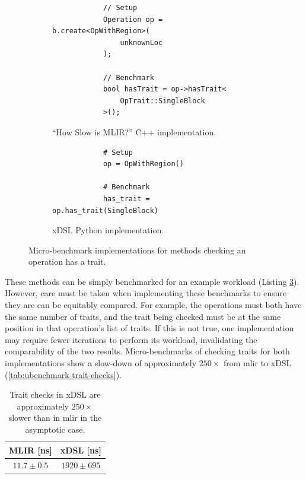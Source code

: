 \begin{figure}[H]
    \centering
    \begin{subfigure}[b]{0.45\textwidth}
       \centering
        \begin{verbatim}
            // Setup
            Operation op = b.create<OpWithRegion>(
                unknownLoc
            );

            // Benchmark
            bool hasTrait = op->hasTrait<
                OpTrait::SingleBlock
            >();
        \end{verbatim}
        \caption{``How Slow is MLIR?'' C++ implementation.}
        \label{listing:ubenchmark-trait-checks-bench-mlir}
    \end{subfigure}
    \hfill
    \begin{subfigure}[b]{0.45\textwidth}
        \centering
        \begin{verbatim}
            # Setup
            op = OpWithRegion()

            # Benchmark
            has_trait = op.has_trait(SingleBlock)
        \end{verbatim}
        \footnotesize\vspace{2em}
        \caption{xDSL Python implementation.}
        \label{listing:ubenchmark-trait-checks-bench-xdsl}
    \end{subfigure}
    \vspace{1em}
    \captionsetup{name=Listing}
    \caption{Micro-benchmark implementations for methods checking an operation has a trait.}
    \label{listing:ubenchmark-trait-checks-bench}
\end{figure}

These methods can be simply benchmarked for an example workload (Listing \ref{listing:ubenchmark-trait-checks-bench}).
However, care must be taken when implementing these benchmarks to ensure they are can be equitably compared. For example, the operations must both have the same number of traits, and the trait being checked must be at the same position in that operation's list of traits.
If this is not true, one implementation may require fewer iterations to perform its workload, invalidating the comparability of the two results.
Micro-benchmarks of checking traits for both implementations show a slow-down of approximately $250\times$ from \ac{mlir} to xDSL (\autoref{tab:ubenchmark-trait-checks}).

\begin{table}[H]
  \caption{Trait checks in xDSL are approximately $250\times$ slower than in \ac{mlir} in the asymptotic case.}
  \label{tab:ubenchmark-trait-checks}
  \centering
  \begin{tabular}{cc}
    \toprule
    \textbf{MLIR [ns]} & \textbf{xDSL [ns]}\\
    \midrule
    $11.7 \pm 0.5$ & $1920 \pm 695$ \\
    \bottomrule
  \end{tabular}
\end{table}


